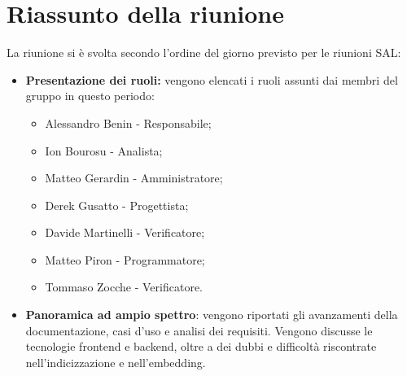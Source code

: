 \section{Riassunto della riunione}
La riunione si è svolta secondo l’ordine del giorno previsto per le riunioni SAL:
\begin{itemize}
    \item \textbf{Presentazione dei ruoli:} 
    vengono elencati i ruoli assunti dai membri del gruppo
in questo periodo:
\begin{itemize}
        \item Alessandro Benin - Responsabile;
        \item Ion Bourosu - Analista;
        \item Matteo Gerardin - Amministratore;
        \item Derek Gusatto - Progettista;
        \item Davide Martinelli - Verificatore;
        \item Matteo Piron - Programmatore;
        \item Tommaso Zocche - Verificatore.
    \end{itemize}
\item \textbf{Panoramica ad ampio spettro}:
vengono riportati gli avanzamenti della documentazione, casi d'uso e analisi dei requisiti.
Vengono discusse le tecnologie frontend e backend, oltre a dei dubbi e difficoltà riscontrate nell'indicizzazione e nell'embedding.


\end{itemize}
